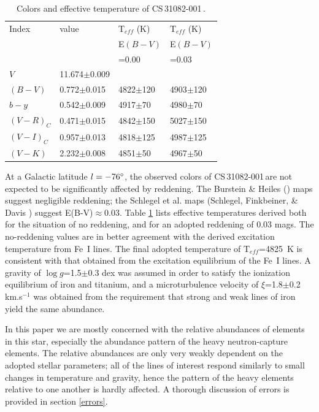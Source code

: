 \documentclass{aa}
\def\cs{CS\,31082-001\,}
\begin{document}
\begin{table}[htbp]
\caption{Colors and effective temperature of \cs.}\label{T-color}
\begin{tabular}{llll}
\hline
 Index    & value &   T$_{eff}$ (K) & T$_{eff}$ (K)\\
& &E$(B-V)$& E$(B-V)$\\

& & =0.00  & =0.03 \\
 $V$     & 11.674$\pm$0.009& \\
 $(B-V)$ & 0.772$\pm$0.015 & 4822$\pm$120 & 4903$\pm$120 \\
 $b-y$   & 0.542$\pm$0.009 & 4917$\pm$70  & 4980$\pm$70 \\
 $(V-R)_{C}$ & 0.471$\pm$0.015 & 4842$\pm$150 & 5027$\pm$150 \\
 $(V-I)_{C}$ & 0.957$\pm$0.013 & 4818$\pm$125 &  4987$\pm$125 \\
 $(V-K)$ & 2.232$\pm$0.008 & 4851$\pm$50 & 4967$\pm$50 \\
\hline\hline
\end{tabular}
\end{table}

At a Galactic latitude $l = -76\hbox{$^\circ$}$, the observed colors of \cs are not
expected to be significantly affected by reddening.  The Burstein \& Heiles
(\cite{bh82}) maps suggest negligible reddening; the Schlegel et al.
maps (Schlegel, Finkbeiner, \& Davis \cite{sc98}) suggest E(B-V)$\approx 0.03$.
Table \ref{T-color} lists effective temperatures derived both for the situation
of no reddening, and for an adopted reddening of 0.03 mags.  The no-reddening
values are in better agreement with the derived excitation temperature from Fe~I
lines.  The final adopted temperature of T$_{eff}$=4825~K is consistent with
that obtained from the excitation equilibrium of the Fe~I lines. A gravity of
$\log g$=1.5$\pm$0.3 dex was assumed in order to satisfy the ionization
equilibrium of iron and titanium, and a microturbulence velocity of
$\xi$=1.8$\pm$0.2 km.s$^{-1}$ was obtained from the requirement that strong and
weak lines of iron yield the same abundance.

In this paper we are mostly concerned with the relative abundances of elements 
in this star, especially the abundance pattern of the heavy neutron-capture
elements.  The relative abundances are only very weakly dependent on the
adopted stellar parameters; all of the lines of interest respond similarly to
small changes in temperature and gravity, hence the pattern of the heavy
elements relative to one another is hardly affected.  A thorough discussion of
errors is provided in section \ref{errors}.
\end{document}
